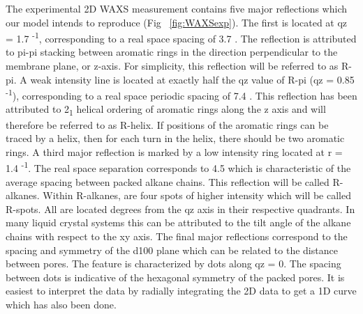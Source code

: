 The experimental 2D WAXS measurement contains five major reflections which
our model intends to reproduce (Fig ~\ref{fig:WAXSexp}). The first is located
at qz = 1.7 \angstrom \textsuperscript{-1}, corresponding to a real space 
spacing of 3.7 \angstrom. The reflection is attributed to pi-pi stacking
between aromatic rings in the direction perpendicular to the membrane plane, or z-axis. 
For simplicity, this reflection will be referred to as R-pi. A weak intensity
line is located at exactly half the qz value of R-pi (qz = 0.85 \angstrom \textsuperscript{-1}), corresponding to a 
real space periodic spacing of 7.4 \angstroms. This reflection has been 
attributed to 2\textsubscript{1} helical ordering of aromatic rings along the
z axis and will therefore be referred to as R-helix. If positions of the 
aromatic rings can be traced by a helix, then for each turn in the helix, 
there should be two aromatic rings. A third major reflection is marked by 
a low intensity ring located at r = 1.4 \angstrom \textsuperscript{-1}. The
real space separation corresponds to 4.5 \angstroms which is characteristic
of the average spacing between packed alkane chains. This reflection will be
called R-alkanes. Within R-alkanes, are four spots of higher intensity which 
will be called R-spots. All are located  degrees from the qz axis
in their respective quadrants. In many liquid crystal systems this can be
attributed to the tilt angle of the alkane chains with respect to the xy axis. 
The final major reflections correspond to the spacing and symmetry of the d100 
plane which can be related to the distance between pores. The feature is
characterized by dots along qz = 0. The spacing between dots is indicative
of the hexagonal symmetry of the packed pores. It is easiest to interpret 
the data by radially integrating the 2D data to get a 1D curve which has
also been done.

